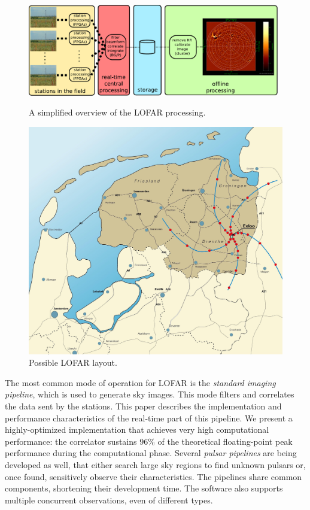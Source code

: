 \documentclass{sig-alternate}
\begin{document}
\begin{figure}
\begin{minipage}[b]{11cm}
\includegraphics[width=11cm]{lofar-overview.pdf}
\caption{A simplified overview of the LOFAR processing.}
\label{fig:lofar-overview}
\end{minipage}
\hfill
\begin{minipage}[b]{6cm}
\includegraphics[width=\columnwidth]{map.jpg}
\caption{Possible LOFAR layout.}
\label{fig:map}
\end{minipage}
\end{figure}

The most common mode of operation for LOFAR is the 
\emph{standard imaging pipeline}, which is used to generate sky images.
This mode filters and correlates the data sent by the stations.
This paper describes the implementation and
performance characteristics of the real-time part of this pipeline.
We present a highly-optimized implementation that achieves very high
computational performance: the correlator sustains 96\% of the theoretical
floating-point peak performance during the computational phase.
Several \emph{pulsar pipelines\/} are being developed as well, that either
search large sky regions to find unknown pulsars or, once found, sensitively
observe their characteristics.
The pipelines share common components, shortening their development time. 
The software also supports multiple concurrent observations, even of different
types.
\end{document}
